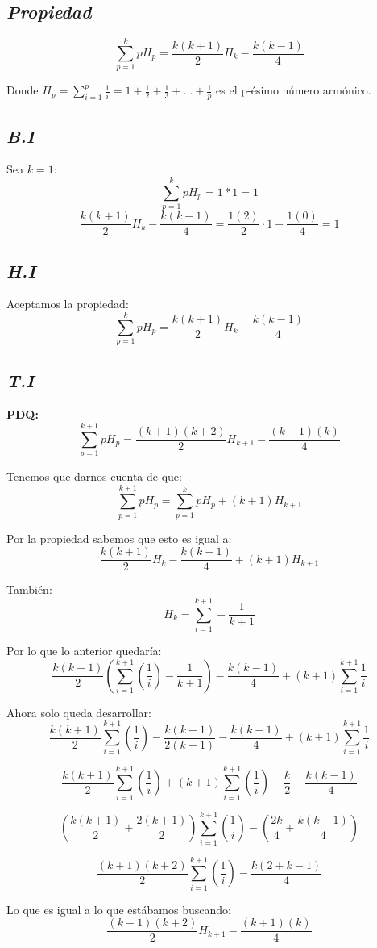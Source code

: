 \documentclass[../doc.tex]{subfiles}
\begin{document}
\subsection*{\emph{Propiedad}}
\[\sum_{p=1}^{k} pH_p = \frac{k(k + 1)}{2}H_k - \frac{k(k-1)}{4}\]

Donde \(H_p = \sum_{i=1}^{p} \frac{1}{i} = 1 + \frac{1}{2} + \frac{1}{3}
+ ... +\frac{1}{p}\) es el p-ésimo número armónico.

\subsection*{\emph{B.I}}
Sea \(k = 1\):
\[\sum_{p=1}^{k} pH_p = 1*1 = 1\]
\[\frac{k(k + 1)}{2}H_k - \frac{k(k-1)}{4} = \frac{1(2)}{2} \cdot 1 - \frac{1(0)}{4} = 1\]

\subsection*{\emph{H.I}}
Aceptamos la propiedad:
\[\sum_{p=1}^{k} pH_p = \frac{k(k + 1)}{2}H_k - \frac{k(k-1)}{4}\]

\subsection*{\emph{T.I}}

\textbf{PDQ:}
\[\sum_{p=1}^{k+1} pH_p = \frac{(k+1)(k+2)}{2}H_{k+1} - \frac{(k+1)(k)}{4}\]

\noindent Tenemos que darnos cuenta de que:
\[\sum_{p=1}^{k+1} pH_p = \sum_{p=1}^{k} pH_p + (k+1)H_{k+1}\]

\noindent Por la propiedad sabemos que esto es igual a:
\[\frac{k(k + 1)}{2}H_k - \frac{k(k-1)}{4} + (k+1)H_{k+1}\]

\noindent También:
\[ H_{k} = \sum_{i=1}^{k+1} - \frac{1}{k+1}\]

\noindent Por lo que lo anterior quedaría:
\[\frac{k(k + 1)}{2}(\sum_{i=1}^{k+1} (\frac{1}{i}) - \frac{1}{k+1})
- \frac{k(k-1)}{4} + (k+1)\sum_{i=1}^{k+1} \frac{1}{i}\]

\noindent Ahora solo queda desarrollar:
\[\frac{k(k + 1)}{2}\sum_{i=1}^{k+1} (\frac{1}{i}) - \frac{k(k + 1)}{2(k+1)}
- \frac{k(k-1)}{4} + (k+1)\sum_{i=1}^{k+1} \frac{1}{i}\]

\[\frac{k(k + 1)}{2}\sum_{i=1}^{k+1} (\frac{1}{i})
+ (k+1)\sum_{i=1}^{k+1} (\frac{1}{i}) - \frac{k}{2} - \frac{k(k-1)}{4}\]

\[(\frac{k(k + 1)}{2} + \frac{2(k+1)}{2})\sum_{i=1}^{k+1} (\frac{1}{i})
- (\frac{2k}{4} + \frac{k(k-1)}{4})\]

\[\frac{(k + 1)(k + 2)}{2}\sum_{i=1}^{k+1} (\frac{1}{i}) - \frac{k(2 + k - 1)}{4}\]

\noindent Lo que es igual a lo que estábamos buscando:
\[\frac{(k+1)(k+2)}{2}H_{k+1} - \frac{(k+1)(k)}{4}\]
\end{document}

